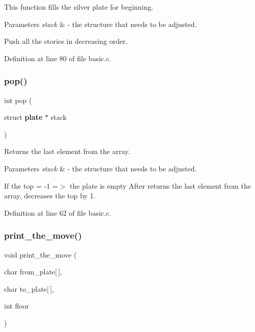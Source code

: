 This function fills the silver plate for beginning. 


\begin{DoxyParams}{Parameters}
{\em stack} & -\/ the structure that needs to be adjusted.\\
\hline
\end{DoxyParams}
Push all the stories in decreasing order. 

Definition at line 80 of file basic.\+c.

\mbox{\label{basic_8h_ad6f1b792f8fb94cc339dcb63188b591f}} 
\subsubsection{pop()}
{\footnotesize\ttfamily int pop (\begin{DoxyParamCaption}\item[{struct \textbf{ plate} $\ast$}]{stack }\end{DoxyParamCaption})}



Returns the last element from the array. 


\begin{DoxyParams}{Parameters}
{\em stack} & -\/ the structure that needs to be adjusted.\\
\hline
\end{DoxyParams}
If the top = -\/1 =$>$ the plate is empty After returns the last element from the array, decreases the top by 1. 

Definition at line 62 of file basic.\+c.

\mbox{\label{basic_8h_aeb7199b4cba8c09d4febbf9ce250e4a4}} 
\subsubsection{print\+\_\+the\+\_\+move()}
{\footnotesize\ttfamily void print\+\_\+the\+\_\+move (\begin{DoxyParamCaption}\item[{char}]{from\+\_\+plate[$\,$],  }\item[{char}]{to\+\_\+plate[$\,$],  }\item[{int}]{floor }\end{DoxyParamCaption})}




